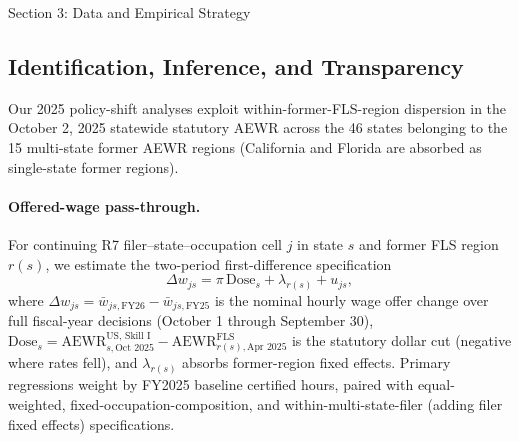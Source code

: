 \begin{llmdraft}{Section 3: Data and Empirical Strategy}
\subsection{Identification, Inference, and Transparency}

Our 2025 policy-shift analyses exploit within-former-FLS-region dispersion in
the October 2, 2025 statewide statutory AEWR across the 46 states belonging to
the 15 multi-state former AEWR regions (California and Florida are absorbed as
single-state former regions).

\paragraph{Offered-wage pass-through.}
For continuing R7 filer--state--occupation cell $j$ in state $s$ and former
FLS region $r(s)$, we estimate the two-period first-difference specification
\begin{equation}
  \Delta w_{js} = \pi \, \text{Dose}_s + \lambda_{r(s)} + u_{js},
  \label{eq:wage_reg}
\end{equation}
where $\Delta w_{js} = \bar{w}_{js,\text{FY26}} - \bar{w}_{js,\text{FY25}}$ is
the nominal hourly wage offer change over full fiscal-year decisions (October 1
through September 30), $\text{Dose}_s = \text{AEWR}^{\text{US, Skill I}}_{s,\text{Oct 2025}} - \text{AEWR}^{\text{FLS}}_{r(s),\text{Apr 2025}}$ is the
statutory dollar cut (negative where rates fell), and $\lambda_{r(s)}$ absorbs
former-region fixed effects. Primary regressions weight by FY2025 baseline
certified hours, paired with equal-weighted, fixed-occupation-composition, and
within-multi-state-filer (adding filer fixed effects) specifications.


\end{llmdraft}
